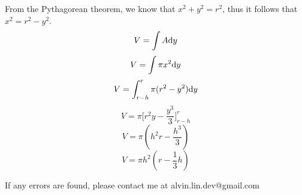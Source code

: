 \documentclass[letterpaper, 12pt]{math}
\begin{document}
From the Pythagorean theorem, we know that \( x^{2}+y^{2} = r^{2} \), thus it
follows that \( x^{2} = r^{2}-y^{2} \).
\[ V = \int{A\mathrm{d}{y}} \]
\[ V = \int{\pi x^{2}\mathrm{d}{y}} \]
\[ V = \int_{r-h}^{r}{\pi(r^{2}-y^{2})\mathrm{d}{y}} \]
\[ V = \pi\bigg[r^{2}y-\frac{y^{3}}{3}\bigg]_{r-h}^{r} \]
\[ V = \pi(h^{2}r-\frac{h^{3}}{3}) \]
\[ V = \pi h^{2}(r-\frac{1}{3}h) \]

\begin{center}
  If any errors are found, please contact me at alvin.lin.dev@gmail.com
\end{center}
\end{document}
